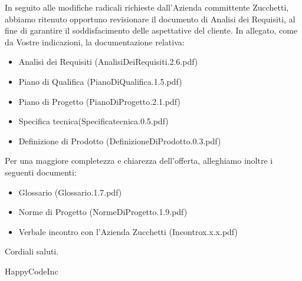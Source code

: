\documentclass[11pt,titlepage,a4paper]{report}
\begin{document}
In seguito alle modifiche radicali richieste dall'Azienda committente Zucchetti, abbiamo ritenuto opportuno revisionare il documento di Analisi dei Requisiti, al fine di garantire il soddisfacimento delle aspettative del cliente. \newline
In allegato, come da Vostre indicazioni, la documentazione relativa:
\begin{itemize}
\item{}Analisi dei Requisiti (AnalisiDeiRequisiti.2.6.pdf)
\item{}Piano di Qualifica (PianoDiQualifica.1.5.pdf)
\item{}Piano di Progetto (PianoDiProgetto.2.1.pdf)
\item{}Specifica tecnica(Specificatecnica.0.5.pdf) 
\item{}Definizione di Prodotto (DefinizioneDiProdotto.0.3.pdf)
\end{itemize}
Per una maggiore completezza e chiarezza dell'offerta, alleghiamo inoltre i seguenti documenti:
\begin{itemize}
\item{}Glossario (Glossario.1.7.pdf)
\item{}Norme di Progetto (NormeDiProgetto.1.9.pdf)
\item{}Verbale incontro con l'Azienda Zucchetti (Incontrox.x.x.pdf)
\end{itemize}
Cordiali saluti.
\begin{flushright}
HappyCodeInc
\end{flushright}
\end{document}
